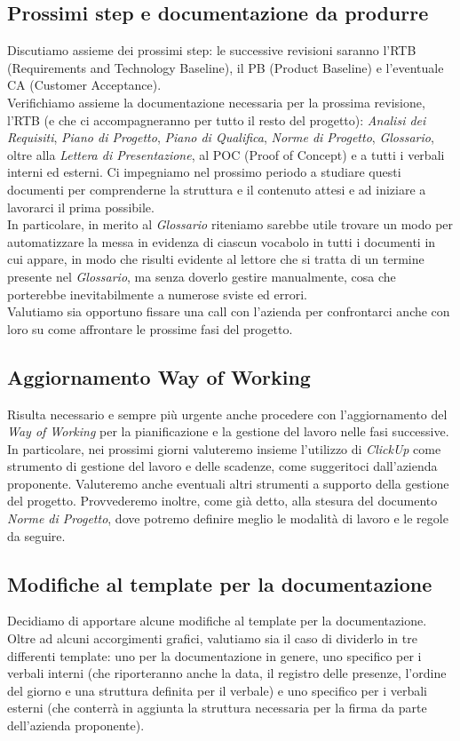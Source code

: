 \documentclass[italian,12pt]{article} %
\begin{document}
\subsection{Prossimi step e documentazione da produrre}
Discutiamo assieme dei prossimi step: le successive revisioni saranno l'RTB 
(Requirements and Technology Baseline), il PB (Product Baseline) e l'eventuale 
CA (Customer Acceptance). \\
Verifichiamo assieme la documentazione necessaria per la prossima revisione, l'RTB 
(e che ci accompagneranno per tutto il resto del progetto): 
\textit{Analisi dei Requisiti}, \textit{Piano di Progetto}, 
\textit{Piano di Qualifica}, \textit{Norme di Progetto}, \textit{Glossario}, 
oltre alla \textit{Lettera di Presentazione}, al POC (Proof of Concept) e a tutti 
i verbali interni ed esterni. Ci impegniamo nel prossimo periodo a studiare 
questi documenti per comprenderne la struttura e il contenuto attesi e ad iniziare 
a lavorarci il prima possibile. \\
In particolare, in merito al \textit{Glossario} riteniamo sarebbe utile trovare 
un modo per automatizzare la messa in evidenza di ciascun vocabolo in tutti i 
documenti in cui appare, in modo che risulti evidente al lettore che si tratta di 
un termine presente nel \textit{Glossario}, ma senza doverlo gestire manualmente, 
cosa che porterebbe inevitabilmente a numerose sviste ed errori. \\
Valutiamo sia opportuno fissare una call con l'azienda per confrontarci anche 
con loro su come affrontare le prossime fasi del progetto.

\subsection{Aggiornamento Way of Working}
Risulta necessario e sempre più urgente anche procedere con l'aggiornamento del 
\textit{Way of Working} per la pianificazione e la gestione del lavoro nelle fasi 
successive. \\
In particolare, nei prossimi giorni valuteremo insieme l'utilizzo di \textit{ClickUp} 
come strumento di gestione del lavoro e delle scadenze, come suggeritoci 
dall'azienda proponente. Valuteremo anche eventuali altri strumenti a supporto della 
gestione del progetto. Provvederemo inoltre, come già detto, alla stesura del 
documento \textit{Norme di Progetto}, dove potremo definire meglio le modalità di 
lavoro e le regole da seguire.

\subsection{Modifiche al template per la documentazione}
Decidiamo di apportare alcune modifiche al template per la documentazione. \\
Oltre ad alcuni accorgimenti grafici, valutiamo sia il caso di dividerlo 
in tre differenti template: uno per la documentazione in genere, uno specifico per 
i verbali interni (che riporteranno anche la data, il registro delle presenze, 
l'ordine del giorno e una struttura definita per il verbale) e uno specifico per 
i verbali esterni (che conterrà in aggiunta la struttura necessaria per la firma 
da parte dell'azienda proponente).
\end{document}
